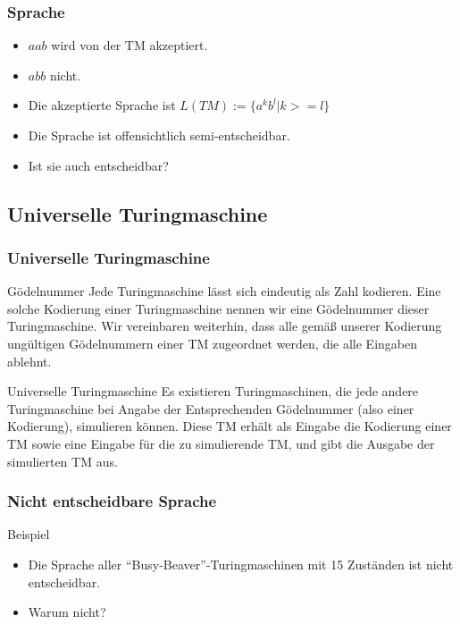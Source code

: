 \documentclass{beamer}
\begin{document}
{\begin{frame}
 \frametitle{Sprache}
 \begin{itemize}
  \item $aab$ wird von der TM akzeptiert.
  \item $abb$ nicht.
  \item Die akzeptierte Sprache ist $L(TM) := \{a^kb^l| k >= l\}$
  \item Die Sprache ist offensichtlich semi-entscheidbar.
  \item Ist sie auch entscheidbar?
 \end{itemize}
\end{frame}



\subsection{Universelle Turingmaschine}
\begin{frame}
\frametitle{Universelle Turingmaschine}
\begin{block}{Gödelnummer}
Jede Turingmaschine lässt sich eindeutig als Zahl kodieren. Eine solche Kodierung einer Turingmaschine nennen wir eine Gödelnummer dieser Turingmaschine. Wir vereinbaren weiterhin, dass alle gemäß unserer Kodierung ungültigen Gödelnummern einer TM zugeordnet werden, die alle Eingaben ablehnt.
\end{block}
\begin{block}{Universelle Turingmaschine}
Es existieren Turingmaschinen, die jede andere Turingmaschine bei Angabe der Entsprechenden Gödelnummer (also einer Kodierung), simulieren können. Diese TM erhält als Eingabe die Kodierung einer TM sowie eine Eingabe für die zu simulierende TM, und gibt die Ausgabe der simulierten TM aus.
\end{block}
\end{frame}

\begin{frame}
 \frametitle{Nicht entscheidbare Sprache}
 \begin{block}{Beispiel}
 \begin{itemize}
  \item Die Sprache aller ``Busy-Beaver''-Turingmaschinen mit 15 Zuständen ist nicht entscheidbar.
  \item Warum nicht?
 \end{itemize}
 \end{block}
\end{frame}

}
\end{document}
